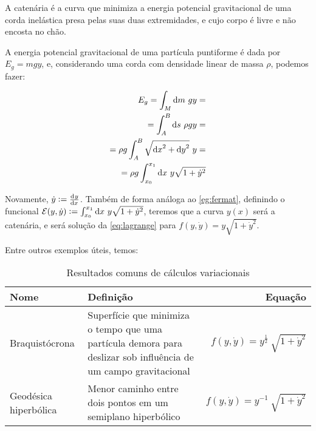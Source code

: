 \begin{eg}[Catenária]
    \label{eg:catenaria}
    A catenária é a curva que minimiza a energia potencial gravitacional de uma
    corda inelástica presa pelas suas duas extremidades, e cujo corpo é livre e
    não encosta no chão.

    A energia potencial gravitacional de uma partícula puntiforme é dada por
    $E_g = mgy$, e, considerando uma corda com densidade linear de massa $\rho$,
    podemos fazer:

    \begin{equation}
        \begin{aligned}
            E_g = \int_M \dif m ~ gy =& \\
            = \int_A^B \dif s~\rho gy =& \\
            = \rho g \int_A^B \sqrt{{\dif x}^2 + {\dif y}^2}~y =& \\
            = \rho g \int_{x_0}^{x_1} \dif x~y \sqrt{1 + {\dot y}^2}
        \end{aligned}
    \end{equation}

    Novamente, $\dot y := \tod{y}{x}$. Também de forma análoga ao
    \autoref{eg:fermat}, definindo o funcional $\mathcal{E}(y, \dot y) :=
    \int_{x_0}^{x_1} \dif x~y \sqrt{1 + {\dot y}^2}$, teremos que a curva $y(x)$
    será a catenária, e será solução da \autoref{eq:lagrange} para $f(y, \dot y)
    = y \sqrt{1 + {\dot y}^2}$.
\end{eg}

Entre outros exemplos úteis, temos:

\begin{table}[H]
	\centering
	\begin{tabularx}{\textwidth}{lXr}
		\toprule
		Nome & Definição & Equação \\
        \midrule
        Braquistócrona & %
            Superfície que minimiza o tempo que uma partícula demora para %
            deslizar sob influência de um campo gravitacional & %
            $f(y, \dot y) = y^{\frac{1}{2}}~\sqrt{1 + {\dot y}^2}$ \\ 
        Geodésica hiperbólica & %
            Menor caminho entre dois pontos em um semiplano hiperbólico & %
            $f(y, \dot y) = y^{-1}~\sqrt{1 + {\dot y}^2}$ \\
		\bottomrule
	\end{tabularx}
	\caption{Resultados comuns de cálculos variacionais}
	\label{tab:varcalc_eg}
\end{table}

